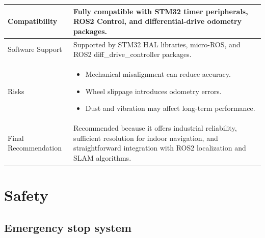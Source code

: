 \documentclass[12pt,a4paper]{article}
\begin{document}
\begin{longtable}{|p{4cm}|p{10cm}|}
Compatibility &
Fully compatible with STM32 timer peripherals, ROS2 Control, and differential-drive odometry packages. \\
\hline

Software Support &
Supported by STM32 HAL libraries, micro-ROS, and ROS2 diff\_drive\_controller packages. \\
\hline

Risks &
\begin{itemize}
\item Mechanical misalignment can reduce accuracy.
\item Wheel slippage introduces odometry errors.
\item Dust and vibration may affect long-term performance.
\end{itemize}
\\
\hline

Final Recommendation &
Recommended because it offers industrial reliability, sufficient resolution for indoor navigation, and straightforward integration with ROS2 localization and SLAM algorithms.
\\
\hline

\end{longtable}
\section{Safety}
\subsection{Emergency stop system}
\end{document}
